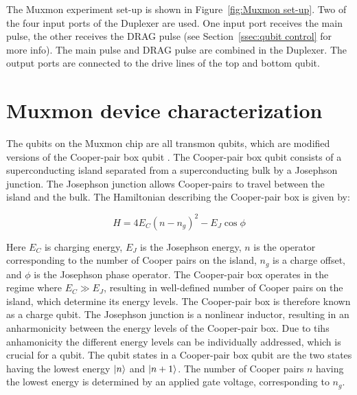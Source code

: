       The Muxmon experiment set-up is shown in Figure~\ref{fig:Muxmon set-up}. Two of the four input ports of the Duplexer are used. One input port receives the main pulse, the other receives the DRAG pulse (see Section~\ref{ssec:qubit control} for more info). The main pulse and DRAG pulse are combined in the Duplexer. The output ports are connected to the drive lines of the top and bottom qubit.

  \chapter{Muxmon device characterization}
    \label{ch:Muxmon device characterization}
    The qubits on the Muxmon chip are all transmon qubits, which are modified versions of the Cooper-pair box qubit \cite{bouchiat1998CooperPairBox}. The Cooper-pair box qubit consists of a superconducting island separated from a superconducting bulk by a Josephson junction. The Josephson junction allows Cooper-pairs to travel between the island and the bulk. The Hamiltonian describing the Cooper-pair box is given by:

    \begin{equation}
      H=4 E_C (n - n_g)^2-E_J \cos \phi
      \label{eq:Cooper-pair box Hamiltonian}
    \end{equation}

    Here $E_C$ is charging energy, $E_J$ is the Josephson energy, $n$ is the operator corresponding to the number of Cooper pairs on the island, $n_g$ is a charge offset, and $\phi$ is the Josephson phase operator. The Cooper-pair box operates in the regime where $E_C \gg E_J$, resulting in well-defined number of Cooper pairs on the island, which determine its energy levels. The Cooper-pair box is therefore known as a charge qubit. The Josephson junction is a nonlinear inductor, resulting in an anharmonicity between the energy levels of the Cooper-pair box. Due to tihs anhamonicity the different energy levels can be individually addressed, which is crucial for a qubit. The qubit states in a Cooper-pair box qubit are the two states having the lowest energy $\ket{n}$ and $\ket{n+1}$. The number of Cooper pairs $n$ having the lowest energy is determined by an applied gate voltage, corresponding to $n_g$.


